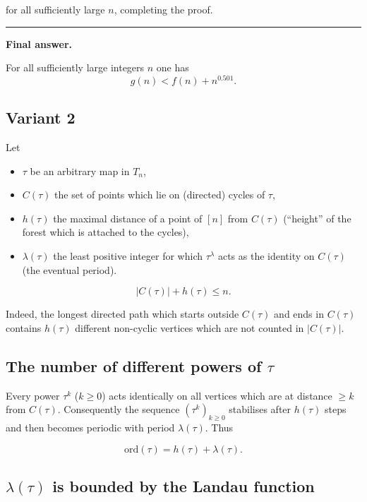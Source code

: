 \documentclass[12pt,a4paper]{article}
\theoremstyle{definition}
\begin{document}
    for all sufficiently large $n$, completing the proof.

    \rule{\textwidth}{0.4pt}
    \textbf{Final answer.}

    For all sufficiently large integers $n$ one has
    \begin{equation*}
        g(n) < f(n) + n^{0.501}.
    \end{equation*}

\subsection{Variant 2}
    Let
    \begin{itemize}
        \item $\tau$ be an arbitrary map in $T_n$,
        \item $C(\tau)$ the set of points which lie on (directed) cycles of $\tau$,
        \item $h(\tau)$ the maximal distance of a point of $[n]$ from $C(\tau)$ (``height'' of the forest which is attached to the cycles),
        \item $\lambda(\tau)$ the least positive integer for which $\tau^\lambda$ acts as the identity on $C(\tau)$ (the eventual period).
    \end{itemize}

    \begin{equation}
        |C(\tau)| + h(\tau) \leq n.
    \end{equation}

    Indeed, the longest directed path which starts outside $C(\tau)$ and ends in $C(\tau)$ contains $h(\tau)$ different non-cyclic vertices which are not counted in $|C(\tau)|$.

    \subsection*{The number of different powers of $\tau$}

    Every power $\tau^k$ ($k \geq 0$) acts identically on all vertices which are at distance $\geq k$ from $C(\tau)$.
    Consequently the sequence $(\tau^k)_{k \geq 0}$ stabilises after $h(\tau)$ steps and then becomes periodic
    with period $\lambda(\tau)$. Thus

    \begin{equation}
        \text{ord}(\tau) = h(\tau) + \lambda(\tau).
    \end{equation}


    \subsection*{$\lambda(\tau)$ is bounded by the Landau function}
\end{document}
